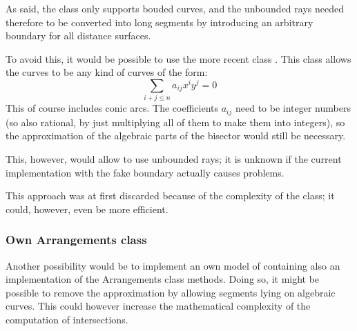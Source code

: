 \documentclass[11pt,a4paper,english]{article}
\begin{document}
	\subsubsection{}
	As said, the  class only supports bouded curves, and the unbounded rays needed therefore to be converted into long segments by introducing an arbitrary boundary for all distance surfaces.\par
	To avoid this, it would be possible to use the more recent class . This class allows the curves to be any kind of curves of the form:
	\[
		\sum_{i+j \leq n} a_{ij} x^{i}y^{j} = 0
	\]
	This of course includes conic arcs. The coefficients \(a_{ij}\) need to be integer numbers (so also rational, by just multiplying all of them to make them into integers), so the approximation of the algebraic parts of the bisector would still be necessary.\par
	This, however, would allow to use unbounded rays; it is unknown if the current implementation with the fake boundary actually causes problems.\par
	This approach was at first discarded because of the complexity of the  class; it could, however, even be more efficient.
	
	\subsubsection{Own Arrangements class}
	Another possibility would be to implement an own model of  containing also an implementation of the Arrangements class methods. Doing so, it might be possible to remove the approximation by allowing segments lying on algebraic curves. This could however increase the mathematical complexity of the computation of intersections.
	
\end{document}
